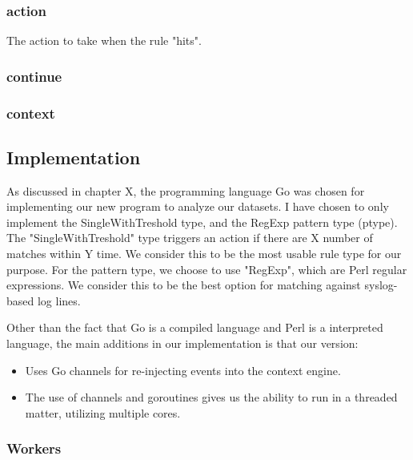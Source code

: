 \subsubsection{action}
The action to take when the rule "hits".

\subsubsection{continue}

\subsubsection{context}

\subsection{Implementation}
As discussed in chapter X, the programming language Go was chosen for implementing our new program to analyze our datasets. I have chosen to only implement the SingleWithTreshold type, and the RegExp pattern type (ptype). The "SingleWithTreshold" type triggers an action if there are X number of matches within Y time. We consider this to be the most usable rule type for our purpose. For the pattern type, we choose to use "RegExp", which are Perl regular expressions. We consider this to be the best option for matching against syslog-based log lines.

Other than the fact that Go is a compiled language and Perl is a interpreted language, the main additions in our implementation is that our version:
\begin{itemize}
    \item Uses Go channels for re-injecting events into the context engine.
    \item The use of channels and goroutines gives us the ability to run in a threaded matter, utilizing multiple cores.
\end{itemize}

\subsubsection{Workers}

